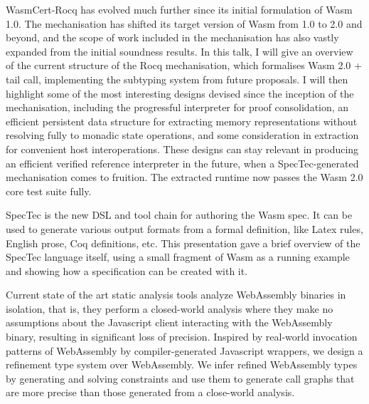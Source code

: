 \documentclass[a4paper,UKenglish]{dagrep-v2018}
\begin{document}
\license
{}

WasmCert-Rocq has evolved much further since its initial formulation of Wasm 1.0. The mechanisation has shifted its target version of Wasm from 1.0 to 2.0 and beyond, and the scope of work included in the mechanisation has also vastly expanded from the initial soundness results. In this talk, I will give an overview of the current structure of the Rocq mechanisation, which formalises Wasm 2.0 + tail call, implementing the subtyping system from future proposals. I will then highlight some of the most interesting designs devised since the inception of the mechanisation, including the progressful interpreter for proof consolidation, an efficient persistent data structure for extracting memory representations without resolving fully to monadic state operations, and some consideration in extraction for convenient host interoperations. These designs can stay relevant in producing an efficient verified reference interpreter in the future, when a SpecTec-generated mechanisation comes to fruition. The extracted runtime now passes the Wasm 2.0 core test suite fully.

\license
{}

SpecTec is the new DSL and tool chain for authoring the Wasm spec. It can be used to generate various output formats from a formal definition, like Latex rules, English prose, Coq definitions, etc. This presentation gave a brief overview of the SpecTec language itself, using a small fragment of Wasm as a running example and showing how a specification can be created with it.

\license
{}

Current state of the art static analysis tools analyze WebAssembly binaries in isolation, that is, they perform a closed-world analysis where they make no assumptions about the Javascript client interacting with the WebAssembly binary, resulting in significant loss of precision. Inspired by real-world invocation patterns of WebAssembly by compiler-generated Javascript wrappers, we design a refinement type system over WebAssembly. We infer refined WebAssembly types by generating and solving constraints and use them to generate call graphs that are more precise than those generated from a close-world analysis.
\end{document}
